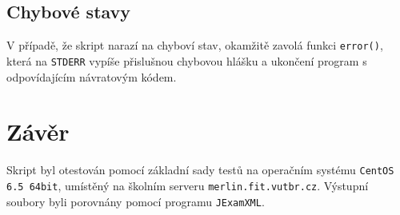 \documentclass[a4paper, 10pt]{article}
\begin{document}
\subsection{Chybové stavy}
V případě, že skript narazí na chyboví stav, okamžitě zavolá funkci \texttt{error()}, která na \texttt{STDERR} vypíše přislušnou chybovou hlášku a ukončení program s odpovídajícím návratovým kódem.

\section{Závěr}
Skript byl otestován pomocí základní sady testů na operačním systému \texttt{CentOS 6.5 64bit}, umístěný na školním serveru \texttt{merlin.fit.vutbr.cz}. Výstupní soubory byli porovnány pomocí programu \texttt{JExamXML}.
                                                                                                                                                                                    
\end{document}
